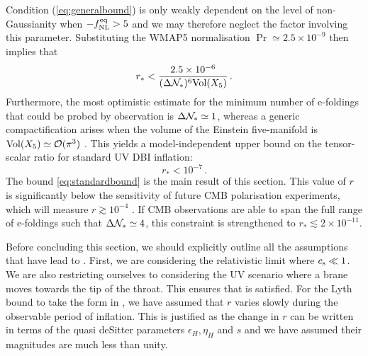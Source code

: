Condition (\ref{eq:generalbound}) is 
only weakly dependent on the level of non-Gaussianity 
when $-f_{\mathrm{NL}}^{\mathrm{eq}} > 5$ and we may therefore neglect the 
factor involving this parameter. 
Substituting the WMAP5 normalisation 
$\Pr \simeq 2.5 \times 10^{-9}$ then implies that
%  
\begin{equation}
\label{eq:upperbound}
r_{*} < \frac{2.5\times 10^{-6}}{( \Delta \mathcal{N}_*)^6 \mathrm{Vol}(X_5)} \,.
\end{equation}
% 
Furthermore, the most optimistic 
estimate for the minimum number of e-foldings that could be 
probed by observation is $\Delta \mathcal{N}_{*} \simeq 1$, whereas
a generic compactification arises when 
the volume of the Einstein five-manifold is $\mathrm{Vol}(X_5) 
\simeq {\cal{O}} (\pi^3)$ \cite{ks}. This yields a model-independent 
upper bound on the tensor-scalar ratio for standard UV DBI inflation:
%    
\begin{equation}
\label{eq:standardbound}
r_* < 10^{-7} \,.
\end{equation}
% 
The bound \eqref{eq:standardbound} is the main result of this section.
This value of $r$ is significantly below the sensitivity 
of future CMB polarisation experiments, which will measure 
${r} \gtrsim 10^{-4}$ \cite{Baumann:2008aq,vpj}. 
If CMB  
observations are able to span the full range of e-foldings such that
$\Delta \mathcal{N}_* \simeq 4$, this constraint is strengthened to 
${r_*} \lesssim {2 \times 10^{-11}}$.


Before concluding this section, we should explicitly outline all the assumptions that have lead to
. First, we are considering the relativistic limit where $c_\mathrm{s}\ll1$. We are
also restricting ourselves to considering the UV scenario where a brane moves towards the tip of
the throat. This ensures that  is satisfied. For the Lyth bound to take the
form in , we have assumed that $r$ varies slowly during the observable
period of inflation. This is justified as the change in $r$ can be written in terms of the
quasi deSitter parameters $\epsilon_H, \eta_H$ and $s$ and we have assumed their magnitudes are
much less than unity.

